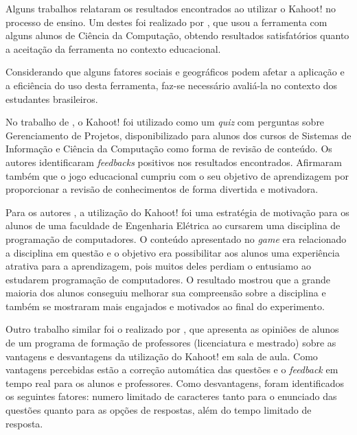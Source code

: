 \documentclass[
	12pt,				%
	openright,			%
	oneside,
	a4paper,			%
	english,			%
	french,				%
	spanish,			%
	brazil,				%
	]{abntex2}
\begin{document}
Alguns trabalhos relataram os resultados encontrados ao utilizar o Kahoot! no processo de ensino. Um destes foi realizado por , que usou a ferramenta com alguns alunos de Ciência da Computação, obtendo resultados satisfatórios quanto a aceitação da ferramenta no contexto educacional.

    
 Considerando que alguns fatores sociais e geográficos podem afetar a aplicação e a eficiência do uso desta ferramenta, faz-se necessário avaliá-la no contexto dos estudantes brasileiros.
 
 No trabalho de , o Kahoot! foi utilizado como um \textit{quiz} com perguntas sobre Gerenciamento de Projetos, disponibilizado para alunos dos cursos de Sistemas de
Informação e Ciência da Computação como forma de revisão de conteúdo. Os autores identificaram \textit{feedbacks} positivos nos resultados encontrados. Afirmaram também que o jogo educacional cumpriu com o seu objetivo de aprendizagem por proporcionar a revisão de conhecimentos de forma divertida e motivadora.

Para os autores , a utilização do Kahoot! foi uma estratégia de motivação para os alunos de uma faculdade de Engenharia Elétrica ao cursarem uma disciplina de programação de computadores. O conteúdo apresentado no \textit{game} era relacionado a disciplina em questão e o objetivo era possibilitar aos alunos uma experiência atrativa para a aprendizagem, pois muitos deles perdiam o entusiamo ao estudarem programação de computadores. O resultado mostrou que a grande maioria dos alunos conseguiu melhorar sua  compreensão sobre a disciplina e também se mostraram mais engajados e motivados ao final do experimento.

Outro trabalho similar foi o realizado por , que apresenta as opiniões de alunos de um programa de formação de professores (licenciatura e mestrado) sobre as vantagens e desvantagens da utilização do Kahoot! em sala de aula. Como vantagens percebidas estão a correção automática das questões e o \textit{feedback} em tempo real para os alunos e professores. Como desvantagens, foram identificados os seguintes fatores: numero limitado de caracteres tanto para o enunciado das questões quanto para as opções de respostas, além do tempo limitado de resposta.
\end{document}

